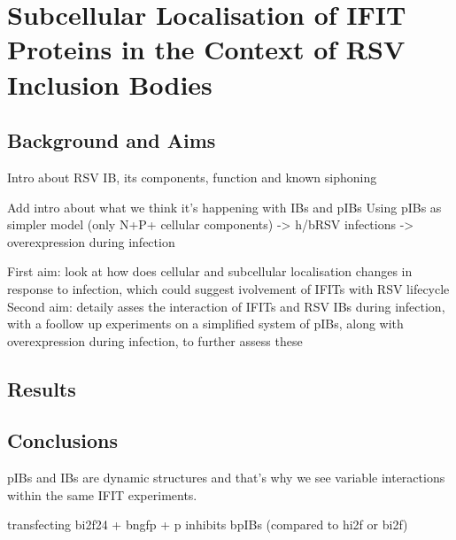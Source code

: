 \chapter{Subcellular Localisation of IFIT Proteins in the Context of RSV Inclusion Bodies} \label{ch:Subcellular Localisation of IFIT Proteins in the Context of RSV Inclusion Bodies}
\section{Background and Aims} \label{sec:Background and Aims-Chapter3}
Intro about RSV IB, its components, function and known siphoning


Add intro about what we think it's happening with IBs and pIBs
Using pIBs as simpler model (only N+P+ cellular components) -> h/bRSV infections -> overexpression during infection

First aim: look at how does cellular and subcellular localisation changes in response to infection, which could suggest ivolvement of IFITs with RSV lifecycle
Second aim: detaily asses the interaction of IFITs and RSV IBs during infection, with a foollow up experiments on a simplified system of pIBs, along with overexpression during infection, to further assess these



\section{Results} \label{sec:Results-Chapter3}





\section{Conclusions} \label{sec:Conclusions-Chapter3}
pIBs and IBs are dynamic structures and that's why we see variable interactions within the same IFIT experiments.

transfecting bi2f24 + bngfp + p inhibits bpIBs (compared to hi2f or bi2f)









